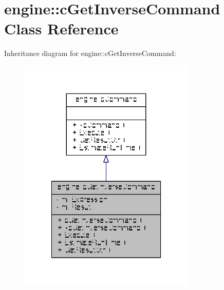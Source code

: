 \hypertarget{classengine_1_1cGetInverseCommand}{\section{engine\-:\-:c\-Get\-Inverse\-Command Class Reference}
\label{classengine_1_1cGetInverseCommand}
}


Inheritance diagram for engine\-:\-:c\-Get\-Inverse\-Command\-:
\nopagebreak
\begin{figure}[H]
\begin{center}
\leavevmode
\includegraphics[width=238pt]{classengine_1_1cGetInverseCommand__inherit__graph}
\end{center}
\end{figure}



